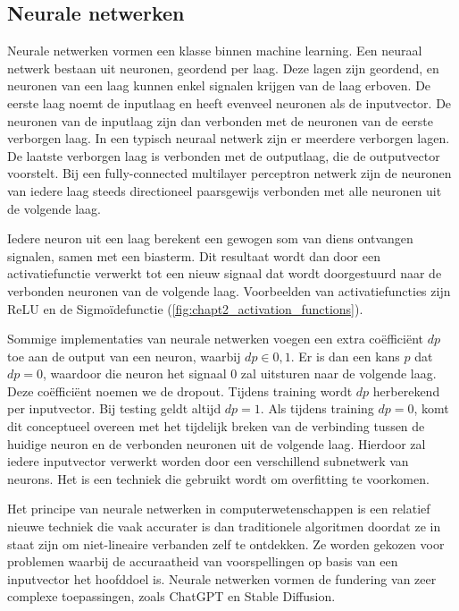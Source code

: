\subsection{Neurale netwerken}
Neurale netwerken vormen een klasse binnen machine learning. Een neuraal netwerk bestaan uit neuronen, geordend per laag. Deze lagen zijn geordend, en neuronen van een laag kunnen enkel signalen krijgen van de laag erboven. De eerste laag noemt de inputlaag en heeft evenveel neuronen als de inputvector. De neuronen van de inputlaag zijn dan verbonden met de neuronen van de eerste verborgen laag. In een typisch neuraal netwerk zijn er meerdere verborgen lagen. De laatste verborgen laag is verbonden met de outputlaag, die de outputvector voorstelt. Bij een fully-connected multilayer perceptron netwerk zijn de neuronen van iedere laag steeds directioneel paarsgewijs verbonden met alle neuronen uit de volgende laag. \cite{multilayer_perceptron_model_cursus}

Iedere neuron uit een laag berekent een gewogen som van diens ontvangen signalen, samen met een biasterm. Dit resultaat wordt dan door een activatiefunctie verwerkt tot een nieuw signaal dat wordt doorgestuurd naar de verbonden neuronen van de volgende laag. Voorbeelden van activatiefuncties zijn ReLU en de Sigmoïdefunctie (\autoref{fig:chapt2_activation_functions}).


Sommige implementaties van neurale netwerken voegen een extra coëfficiënt $dp$ toe aan de output van een neuron, waarbij $dp \in {0, 1}$. Er is dan een kans $p$ dat $dp = 0$, waardoor die neuron het signaal $0$ zal uitsturen naar de volgende laag. Deze coëfficiënt noemen we de dropout. Tijdens training wordt $dp$ herberekend per inputvector. Bij testing geldt altijd $dp = 1$. \cite{nn_dropout} Als tijdens training $dp = 0$, komt dit conceptueel overeen met het tijdelijk breken van de verbinding tussen de huidige neuron en de verbonden neuronen uit de volgende laag. Hierdoor zal iedere inputvector verwerkt worden door een verschillend subnetwerk van neurons. Het is een techniek die gebruikt wordt om overfitting te voorkomen.

Het principe van neurale netwerken in computerwetenschappen is een relatief nieuwe techniek die vaak accurater is dan traditionele algoritmen doordat ze in staat zijn om niet-lineaire verbanden zelf te ontdekken. Ze worden gekozen voor problemen waarbij de accuraatheid van voorspellingen op basis van een inputvector het hoofddoel is. Neurale netwerken vormen de fundering van zeer complexe toepassingen, zoals ChatGPT en Stable Diffusion. \cite{chatgpt_voorbeeld_transformers_arno, stable_diffusion}

